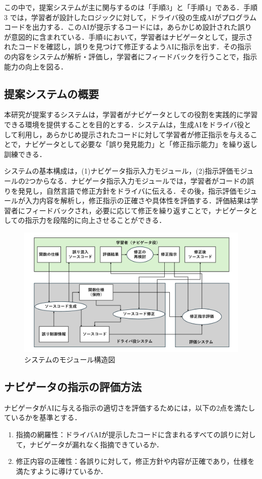 \documentclass[twoside,twocolumn,10pt]{jsarticle}
\begin{document}
この中で，提案システムが主に関与するのは「手順3」と「手順4」である．手順3 では，学習者が設計したロジックに対して，ドライバ役の生成AIがプログラムコードを出力する．このAIが提示するコードには，あらかじめ設計された誤りが意図的に含まれている．手順4において，学習者はナビゲータとして，提示されたコードを確認し，誤りを見つけて修正するようAIに指示を出す．その指示の内容をシステムが解析・評価し，学習者にフィードバックを行うことで，指示能力の向上を図る．

\subsection{提案システムの概要}
本研究が提案するシステムは，学習者がナビゲータとしての役割を実践的に学習できる環境を提供することを目的とする．システムは，生成AIをドライバ役として利用し，あらかじめ提示されたコードに対して学習者が修正指示を与えることで，ナビゲータとして必要な「誤り発見能力」と「修正指示能力」を繰り返し訓練できる．

システムの基本構成は，(1)ナビゲータ指示入力モジュール，(2)指示評価モジュールの2つからなる．ナビゲータ指示入力モジュールでは，学習者がコードの誤りを発見し，自然言語で修正方針をドライバに伝える．その後，指示評価モジュールが入力内容を解析し，修正指示の正確さや具体性を評価する．評価結果は学習者にフィードバックされ，必要に応じて修正を繰り返すことで，ナビゲータとしての指示力を段階的に向上させることができる．

\begin{figure}[h]
  \centering
  \includegraphics[width=1\linewidth]{module.pdf}
  \caption{システムのモジュール構造図}
\end{figure}

\subsection{ナビゲータの指示の評価方法}
ナビゲータがAIに与える指示の適切さを評価するためには，以下の2点を満たしているかを基準とする．
\begin{enumerate}
    \item 指摘の網羅性：ドライバAIが提示したコードに含まれるすべての誤りに対して，ナビゲータが漏れなく指摘できているか．
    \item 修正内容の正確性：各誤りに対して，修正方針や内容が正確であり，仕様を満たすように導けているか．
\end{enumerate}
\end{document}
